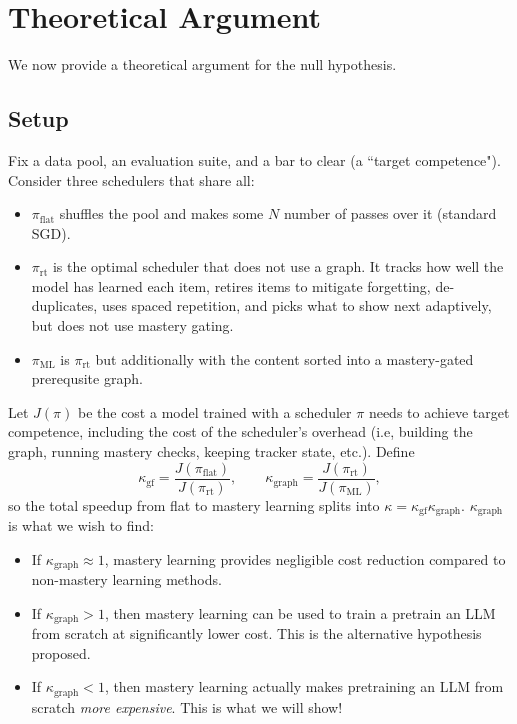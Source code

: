 \documentclass[11pt]{article}
\theoremstyle{plain}
\theoremstyle{definition}
\theoremstyle{remark}
\begin{document}
\newpage

\section{Theoretical Argument}
\label{sec:1}

We now provide a theoretical argument for the null hypothesis.

\subsection{Setup}

Fix a data pool, an evaluation suite, and a bar to clear (a ``target competence"). Consider three schedulers that share all:

\begin{itemize}[itemsep=1pt]
\item $\pi_{\mathrm{flat}}$ shuffles the pool and makes some $N$ number of passes over it (standard SGD).
\item $\pi_{\mathrm{rt}}$ is the optimal scheduler that does not use a graph. It tracks how well the model
has learned each item, retires items to mitigate forgetting, de-duplicates, uses spaced repetition, and picks what to show next adaptively, but does not use mastery gating.
\item $\pi_{\mathrm{ML}}$ is $\pi_{\mathrm{rt}}$ but additionally with the content sorted into a mastery-gated prerequsite graph.
\end{itemize}

Let $J(\pi)$ be the cost a model trained with a scheduler $\pi$ needs to achieve target competence, including the cost of the scheduler's overhead (i.e, building the graph, running mastery checks,
keeping tracker state, etc.). Define
\[
\kappa_{\mathrm{gf}}=\frac{J(\pi_{\mathrm{flat}})}{J(\pi_{\mathrm{rt}})},\qquad
\kappa_{\mathrm{graph}}=\frac{J(\pi_{\mathrm{rt}})}{J(\pi_{\mathrm{ML}})},
\]
so the total speedup from flat to mastery learning splits into $\kappa=\kappa_{\mathrm{gf}}\kappa_{\mathrm{graph}}$. $\kappa_{\mathrm{graph}}$ is what we wish to find:
\begin{itemize}
\item If $\kappa_{\mathrm{graph}} \approx 1$, mastery learning provides negligible cost reduction compared to non-mastery learning methods.
\item If $\kappa_{\mathrm{graph}} > 1$, then mastery learning can be used to train a pretrain an LLM from scratch at significantly lower cost. This is the alternative hypothesis proposed.
\item If $\kappa_{\mathrm{graph}} < 1$, then mastery learning actually makes pretraining an LLM from scratch \emph{more expensive}. This is what we will show!

\end{itemize}
\end{document}
